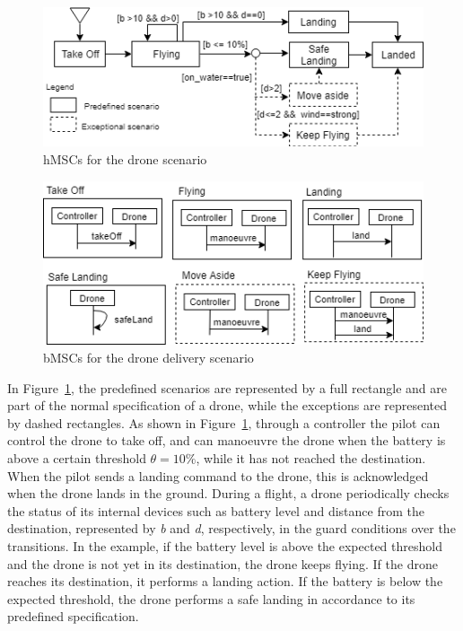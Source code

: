 \begin{figure}
    \includegraphics[width=\columnwidth]{figures/new_drone_msc.png}
    \caption{hMSCs for the drone scenario}
    \label{fig:drone_msc}
    \vspace*{-0.25cm}
\end{figure}

\begin{figure}
    \includegraphics[width=\columnwidth]{figures/new_drone_bmsc.png}
    \caption{bMSCs for the drone delivery scenario}
    \label{fig:drone_bmsc}
    \vspace*{-0.5cm}
\end{figure}

In Figure~\ref{fig:drone_msc}, the predefined scenarios are represented by a full rectangle and are part of the normal specification of a drone, while the exceptions are represented by dashed rectangles. As shown in Figure~\ref{fig:drone_msc}, through a controller the pilot can control the drone to take off, and can manoeuvre the drone when the battery is above a certain threshold $\theta = 10\%$, while it has not reached the destination. When the pilot sends a landing command to the drone, this is acknowledged when the drone lands in the ground.  During a flight, a drone periodically checks the status of its internal devices such as battery level and distance from the destination, represented by \textit{b} and \textit{d}, respectively, in the guard conditions over the transitions. In the example, if the battery level is above the expected threshold and the drone is not yet in its destination, the drone keeps flying. If the drone reaches its destination, it performs a landing action. If the battery is below the expected threshold, the drone performs a safe landing in accordance to its predefined specification. 

